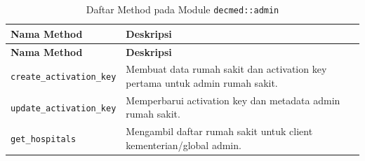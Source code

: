 \documentclass[bahasa, 12pt, a4paper, onecolumn, oneside, final]{report}
\begin{document}
\begin{longtable}{|Y{0.45\textwidth}|Y{0.47\textwidth}|}
	\caption{Daftar Method pada Module \texttt{decmed::admin}}
	\label{tab:daftar-method-decmed-admin}                                                                          \\
	\hline
	\textbf{Nama Method}             & \textbf{Deskripsi}                                                           \\
	\hline
	\endfirsthead
	\hline
	\textbf{Nama Method}             & \textbf{Deskripsi}                                                           \\
	\hline
	\endhead

	\texttt{create\_activation\_key} & Membuat data rumah sakit dan activation key pertama untuk admin rumah sakit. \\ \hline
	\texttt{update\_activation\_key} & Memperbarui activation key dan metadata admin rumah sakit.                   \\ \hline
	\texttt{get\_hospitals}          & Mengambil daftar rumah sakit untuk client kementerian/global admin.          \\ \hline
\end{longtable}
\end{document}
